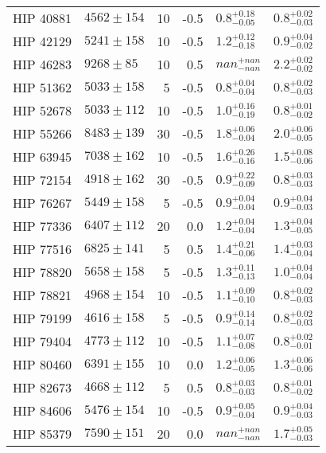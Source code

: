 \documentclass{emulateapj}
\begin{document}
\begin{longtable*}{|l|lrrll|}
  HIP 40881 &  $4562 \pm 154$ &      10 &    -0.5 &  $0.8^{+0.18}_{-0.05}$ &  $0.8^{+0.02}_{-0.03}$ \\
  HIP 42129 &  $5241 \pm 158$ &      10 &    -0.5 &  $1.2^{+0.12}_{-0.18}$ &  $0.9^{+0.04}_{-0.02}$ \\
  HIP 46283 &   $9268 \pm 85$ &      10 &     0.5 &    $nan^{+nan}_{-nan}$ &  $2.2^{+0.02}_{-0.02}$ \\
  HIP 51362 &  $5033 \pm 158$ &       5 &    -0.5 &  $0.8^{+0.04}_{-0.04}$ &  $0.8^{+0.02}_{-0.03}$ \\
  HIP 52678 &  $5033 \pm 112$ &      10 &    -0.5 &  $1.0^{+0.16}_{-0.19}$ &  $0.8^{+0.01}_{-0.02}$ \\
  HIP 55266 &  $8483 \pm 139$ &      30 &    -0.5 &  $1.8^{+0.06}_{-0.04}$ &  $2.0^{+0.06}_{-0.05}$ \\
  HIP 63945 &  $7038 \pm 162$ &      10 &    -0.5 &  $1.6^{+0.26}_{-0.16}$ &  $1.5^{+0.08}_{-0.06}$ \\
  HIP 72154 &  $4918 \pm 162$ &      30 &    -0.5 &  $0.9^{+0.22}_{-0.09}$ &  $0.8^{+0.03}_{-0.03}$ \\
  HIP 76267 &  $5449 \pm 158$ &       5 &    -0.5 &  $0.9^{+0.04}_{-0.04}$ &  $0.9^{+0.04}_{-0.03}$ \\
  HIP 77336 &  $6407 \pm 112$ &      20 &     0.0 &  $1.2^{+0.04}_{-0.04}$ &  $1.3^{+0.04}_{-0.05}$ \\
  HIP 77516 &  $6825 \pm 141$ &       5 &     0.5 &  $1.4^{+0.21}_{-0.06}$ &  $1.4^{+0.03}_{-0.04}$ \\
  HIP 78820 &  $5658 \pm 158$ &       5 &    -0.5 &  $1.3^{+0.11}_{-0.13}$ &  $1.0^{+0.04}_{-0.04}$ \\
  HIP 78821 &  $4968 \pm 154$ &      10 &    -0.5 &  $1.1^{+0.09}_{-0.10}$ &  $0.8^{+0.02}_{-0.03}$ \\
  HIP 79199 &  $4616 \pm 158$ &       5 &    -0.5 &  $0.9^{+0.14}_{-0.14}$ &  $0.8^{+0.02}_{-0.03}$ \\
  HIP 79404 &  $4773 \pm 112$ &      10 &    -0.5 &  $1.1^{+0.07}_{-0.08}$ &  $0.8^{+0.02}_{-0.01}$ \\
  HIP 80460 &  $6391 \pm 155$ &      10 &     0.0 &  $1.2^{+0.06}_{-0.05}$ &  $1.3^{+0.06}_{-0.06}$ \\
  HIP 82673 &  $4668 \pm 112$ &       5 &     0.5 &  $0.8^{+0.03}_{-0.03}$ &  $0.8^{+0.01}_{-0.02}$ \\
  HIP 84606 &  $5476 \pm 154$ &      10 &    -0.5 &  $0.9^{+0.05}_{-0.04}$ &  $0.9^{+0.04}_{-0.03}$ \\
  HIP 85379 &  $7590 \pm 151$ &      20 &     0.0 &    $nan^{+nan}_{-nan}$ &  $1.7^{+0.05}_{-0.03}$ \\

\end{longtable*}
\end{document}
